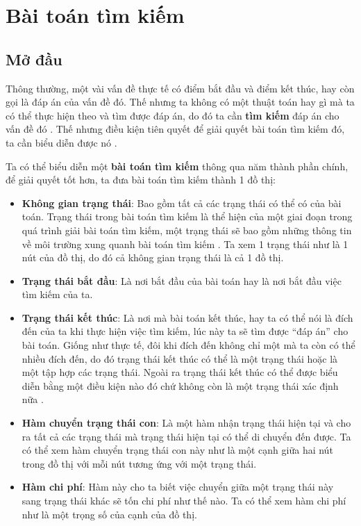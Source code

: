\chapter{Bài toán tìm kiếm}

\section{Mở đầu}

Thông thường, một vài vấn đề thực tế có điểm bắt đầu và điểm kết thúc, hay còn gọi là đáp án của vấn đề đó. Thế nhưng ta không có một thuật toán hay gì mà ta có thể thực hiện theo và tìm được đáp án, do đó ta cần \textbf{tìm kiếm} đáp án cho vấn đề đó \cite{GraphSearch}. Thế nhưng điều kiện tiên quyết để giải quyết bài toán tìm kiếm đó, ta cần biểu diễn được nó \cite{LHB}.
\vspace{7pt}

Ta có thể biểu diễn một \textbf{bài toán tìm kiếm} thông qua năm thành phần chính, để giải quyết tốt hơn, ta đưa bài toán tìm kiếm thành 1 đồ thị:
\begin{itemize}
    \item \textbf{Không gian trạng thái}: Bao gồm tất cả các trạng thái có thể có của bài toán. Trạng thái trong bài toán tìm kiếm là thể hiện của một giai đoạn trong quá trình giải bài toán tìm kiếm, một trạng thái sẽ bao gồm những thông tin về môi trường xung quanh bài toán tìm kiếm \cite{LHB}. Ta xem 1 trạng thái như là 1 nút của đồ thị, do đó cả không gian trạng thái là cả 1 đồ thị.

    \item \textbf{Trạng thái bắt đầu}: Là nơi bắt đầu của bài toán hay là nơi bắt đầu việc tìm kiếm của ta.

    \item \textbf{Trạng thái kết thúc}: Là nơi mà bài toán kết thúc, hay ta có thể nói là đích đến của ta khi thực hiện việc tìm kiếm, lúc này ta sẽ tìm được ``đáp án'' cho bài toán. Giống như thực tế, đôi khi đích đến không chỉ một mà ta còn có thể nhiều đích đến, do đó trạng thái kết thúc có thể là một trạng thái hoặc là một tập hợp các trạng thái. Ngoài ra trạng thái kết thúc có thể được biểu diễn bằng một điều kiện nào đó chứ không còn là một trạng thái xác định nữa \cite{LHB}.

    \item \textbf{Hàm chuyển trạng thái con}: Là một hàm nhận trạng thái hiện tại và cho ra tất cả các trạng thái mà trạng thái hiện tại có thể di chuyển đến được. Ta có thể xem hàm chuyển trạng thái con này như là một cạnh giữa hai nút trong đồ thị với mỗi nút tương ứng với một trạng thái.

    \item \textbf{Hàm chi phí}: Hàm này cho ta biết việc chuyển giữa một trạng thái này sang trạng thái khác sẽ tốn chi phí như thế nào. Ta có thể xem hàm chi phí như là một trọng số của cạnh của đồ thị.
\end{itemize}

